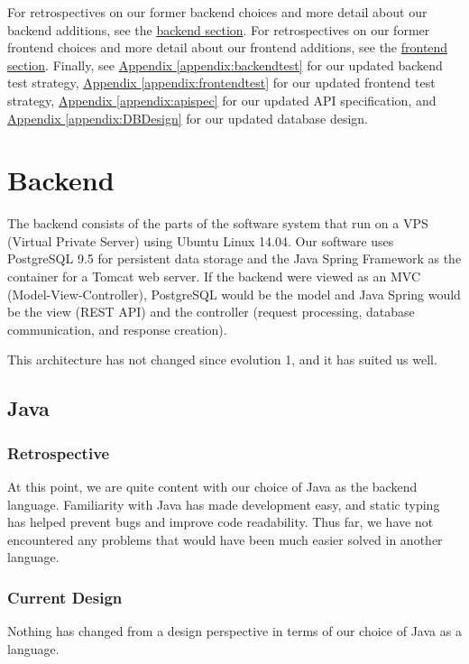 \documentclass[12pt]{article}
\begin{document}
For retrospectives on our former backend choices and more detail about our backend additions, see the \hyperref[sec:Backend]{backend section}. For retrospectives on our former frontend choices and more detail about our frontend additions, see the \hyperref[sec:Frontend]{frontend section}. Finally, see \hyperref[appendix:backendtest]{Appendix \ref{appendix:backendtest}} for our updated backend test strategy,  \hyperref[appendix:frontendtest]{Appendix \ref{appendix:frontendtest}} for our updated frontend test strategy, \hyperref[appendix:apispec]{Appendix \ref{appendix:apispec}} for our updated API specification, and \hyperref[appendix:DBDesign]{Appendix \ref{appendix:DBDesign}} for our updated database design. 

\section{Backend}
\label{sec:Backend}
The backend consists of the parts of the software system that run on a VPS (Virtual Private Server) using Ubuntu Linux 14.04. Our software uses PostgreSQL 9.5 for persistent data storage and the Java Spring Framework as the container for a Tomcat web server. If the backend were viewed as an MVC (Model-View-Controller), PostgreSQL would be the model and Java Spring would be the view (REST API) and the controller (request processing, database communication, and response creation). 

This architecture has not changed since evolution 1, and it has suited us well. 

\subsection{Java}
\subsubsection{Retrospective}
At this point, we are quite content with our choice of Java as the backend language. Familiarity with Java has made development easy, and static typing has helped prevent bugs and improve code readability. Thus far, we have not encountered any problems that would have been much easier solved in another language. 

\subsubsection{Current Design}
Nothing has changed from a design perspective in terms of our choice of Java as a language. 
\end{document}
